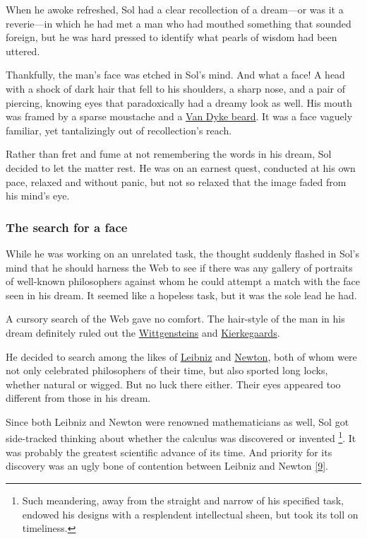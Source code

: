 \documentclass[
  a4paper,
]{article}
\begin{document}
When he awoke refreshed, Sol had a clear recollection of a dream---or
was it a reverie---in which he had met a man who had mouthed something
that sounded foreign, but he was hard pressed to identify what pearls of
wisdom had been uttered.

Thankfully, the man's face was etched in Sol's mind. And what a face! A
head with a shock of dark hair that fell to his shoulders, a sharp nose,
and a pair of piercing, knowing eyes that paradoxically had a dreamy
look as well. His mouth was framed by a sparse moustache and a
\href{https://en.wikipedia.org/wiki/Van_Dyke_beard}{Van Dyke beard}. It
was a face vaguely familiar, yet tantalizingly out of recollection's
reach.

Rather than fret and fume at not remembering the words in his dream, Sol
decided to let the matter rest. He was on an earnest quest, conducted at
his own pace, relaxed and without panic, but not so relaxed that the
image faded from his mind's eye. \emojifont🙂\normalfont

\hypertarget{the-search-for-a-face}{%
\subsubsection{The search for a face}\label{the-search-for-a-face}}

While he was working on an unrelated task, the thought suddenly flashed
in Sol's mind that he should harness the Web to see if there was any
gallery of portraits of well-known philosophers against whom he could
attempt a match with the face seen in his dream. It seemed like a
hopeless task, but it was the sole lead he had.

A cursory search of the Web gave no comfort. The hair-style of the man
in his dream definitely ruled out the
\href{https://tinyurl.com/y2sn8uzb}{Wittgensteins} and
\href{https://tinyurl.com/y3xdx3gl}{Kierkegaards}.

He decided to search among the likes of
\href{https://tinyurl.com/yxomtbt5}{Leibniz} and
\href{https://tinyurl.com/y5lc2fyx}{Newton}, both of whom were not only
celebrated philosophers of their time, but also sported long locks,
whether natural or wigged. But no luck there either. Their eyes appeared
too different from those in his dream.

Since both Leibniz and Newton were renowned mathematicians as well, Sol
got side-tracked thinking about whether the calculus was discovered or
invented \footnote{Such meandering, away from the straight and narrow of
  his specified task, endowed his designs with a resplendent
  intellectual sheen, but took its toll on timeliness.}. It was probably
the greatest scientific advance of its time. And priority for its
discovery was an ugly bone of contention between Leibniz and Newton
\protect\hyperlink{ref-bardi2007}{{[}9{]}}.
\end{document}

